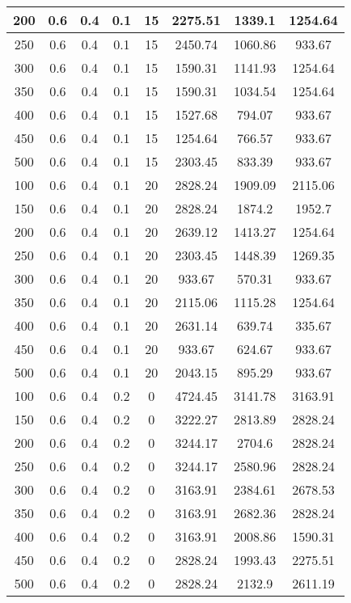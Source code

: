\documentclass[a4paper, 12pt]{extreport}
\begin{document}
\begin{itemize}
\begin{longtable}{|c|c|c|c|c|c|c|c|}
			200 & 0.6 & 0.4 & 0.1 & 15 & 2275.51 & 1339.1 & 1254.64 \\\hline
			250 & 0.6 & 0.4 & 0.1 & 15 & 2450.74 & 1060.86 & 933.67 \\\hline
			300 & 0.6 & 0.4 & 0.1 & 15 & 1590.31 & 1141.93 & 1254.64 \\\hline
			350 & 0.6 & 0.4 & 0.1 & 15 & 1590.31 & 1034.54 & 1254.64 \\\hline
			400 & 0.6 & 0.4 & 0.1 & 15 & 1527.68 & 794.07 & 933.67 \\\hline
			450 & 0.6 & 0.4 & 0.1 & 15 & 1254.64 & 766.57 & 933.67 \\\hline
			500 & 0.6 & 0.4 & 0.1 & 15 & 2303.45 & 833.39 & 933.67 \\\hline
			100 & 0.6 & 0.4 & 0.1 & 20 & 2828.24 & 1909.09 & 2115.06 \\\hline
			150 & 0.6 & 0.4 & 0.1 & 20 & 2828.24 & 1874.2 & 1952.7 \\\hline
			200 & 0.6 & 0.4 & 0.1 & 20 & 2639.12 & 1413.27 & 1254.64 \\\hline
			250 & 0.6 & 0.4 & 0.1 & 20 & 2303.45 & 1448.39 & 1269.35 \\\hline
			300 & 0.6 & 0.4 & 0.1 & 20 & 933.67 & 570.31 & 933.67 \\\hline
			350 & 0.6 & 0.4 & 0.1 & 20 & 2115.06 & 1115.28 & 1254.64 \\\hline
			400 & 0.6 & 0.4 & 0.1 & 20 & 2631.14 & 639.74 & 335.67 \\\hline
			450 & 0.6 & 0.4 & 0.1 & 20 & 933.67 & 624.67 & 933.67 \\\hline
			500 & 0.6 & 0.4 & 0.1 & 20 & 2043.15 & 895.29 & 933.67 \\\hline
			100 & 0.6 & 0.4 & 0.2 & 0 & 4724.45 & 3141.78 & 3163.91 \\\hline
			150 & 0.6 & 0.4 & 0.2 & 0 & 3222.27 & 2813.89 & 2828.24 \\\hline
			200 & 0.6 & 0.4 & 0.2 & 0 & 3244.17 & 2704.6 & 2828.24 \\\hline
			250 & 0.6 & 0.4 & 0.2 & 0 & 3244.17 & 2580.96 & 2828.24 \\\hline
			300 & 0.6 & 0.4 & 0.2 & 0 & 3163.91 & 2384.61 & 2678.53 \\\hline
			350 & 0.6 & 0.4 & 0.2 & 0 & 3163.91 & 2682.36 & 2828.24 \\\hline
			400 & 0.6 & 0.4 & 0.2 & 0 & 3163.91 & 2008.86 & 1590.31 \\\hline
			450 & 0.6 & 0.4 & 0.2 & 0 & 2828.24 & 1993.43 & 2275.51 \\\hline
			500 & 0.6 & 0.4 & 0.2 & 0 & 2828.24 & 2132.9 & 2611.19 \\\hline

\end{longtable}
\end{itemize}
\end{document}
